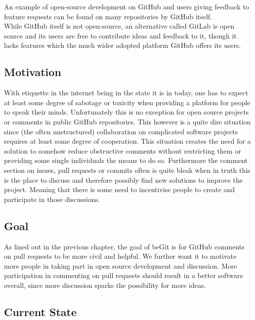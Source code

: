 \documentclass[sigconf]{acmart}
\begin{document}
An example of open-source development on GitHub and users giving feedback to feature requests can be found on many repositories by GitHub itself.\\

While GitHub itself is not open-source, an alternative called GitLab is open source and its users are free to contribute ideas and feedback to it, though it lacks features which the much wider adopted platform GitHub offers its users. \cite{gitlab}\\


\subsection{Motivation}

With etiquette in the internet being in the state it is in today, one has to expect at least some degree of sabotage or toxicity when providing a platform for people to speak their minds. Unfortunately this is no exception for open source projects or comments in public GitHub repositories. This however is a quite dire situation since (the often unstructured) collaboration on complicated software projects requires at least some degree of cooperation.
This situation creates the need for a solution to somehow reduce obstructive comments without restricting them or providing some single individuals the means to do so.
Furthermore the comment section on issues, pull requests or commits often is quite bleak when in truth this is the place to discuss and therefore possibly find new solutions to improve the project. Meaning that there is some need to incentivise people to create and participate in those discussions.


\subsection{Goal}

As lined out in the previous chapter, the goal of beGit is for GitHub comments on pull requests to be more civil and helpful. We further want it to motivate more people in taking part in open source development and discussion. More participation in commenting on pull requests should result in a better software overall, since more discussion sparks the possibility for more ideas.

\subsection{Current State}
\end{document}
